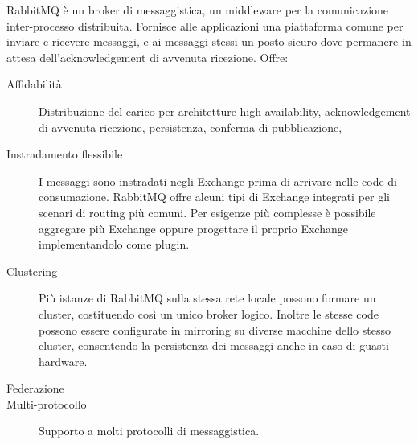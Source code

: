 \begin{description}[nolistsep]
\item[RabbitMQ]
RabbitMQ è un broker di messaggistica, un middleware per la comunicazione inter-processo distribuita. 
Fornisce alle applicazioni una piattaforma comune per inviare e ricevere messaggi, e ai messaggi stessi un posto sicuro dove permanere in attesa dell'acknowledgement di avvenuta ricezione.\cite{RabbitMQWebsite} Offre:
\begin{description}
\item[Affidabilità]Distribuzione del carico per architetture high-availability, acknowledgement di avvenuta ricezione, persistenza, conferma di pubblicazione, 
\item[Instradamento flessibile]I messaggi sono instradati negli Exchange prima di arrivare nelle code di consumazione. RabbitMQ offre alcuni tipi di Exchange integrati per gli scenari di routing più comuni. Per esigenze più complesse è possibile aggregare più Exchange oppure progettare il proprio Exchange implementandolo come plugin.
\item[Clustering]Più istanze di RabbitMQ sulla stessa rete locale possono formare un cluster, costituendo così un unico broker logico.
Inoltre le stesse code possono essere configurate in mirroring su diverse macchine dello stesso cluster, consentendo la persistenza dei messaggi anche in caso di guasti hardware.
\item[Federazione]
\item[Multi-protocollo]Supporto a molti protocolli di messaggistica.
\end{description}


\end{description}
